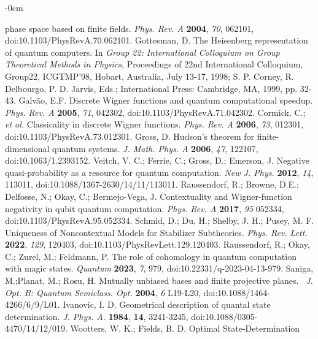 \documentclass[quantumrep,article,submit,pdftex,moreauthors]{Definitions/mdpi}
\begin{document}
\begin{adjustwidth}{-\extralength}{0cm}
\begin{thebibliography}{999}
phase space based on finite fields. \textit{Phys. Rev. A} \textbf{2004}, 
\textit{70}, 062101, doi:10.1103/PhysRevA.70.062101.
 Gottesman, D. The Heisenberg representation of quantum
computers. In \textit{Group 22: International Colloquium on Group
Theoretical Methods in Physics}, Proceedings of 22nd International
Colloquium, Group22, ICGTMP'98, Hobart, Australia, July 13-17, 1998; S. P.
Corney, R. Delbourgo, P. D. Jarvis, Eds.; International Press: Cambridge,
MA, 1999, pp. 32-43.
 Galv\~ao, E.F. Discrete Wigner functions and quantum
computational speedup. \textit{Phys. Rev. A} \textbf{2005}, \textit{71},
042302, doi:10.1103/PhysRevA.71.042302.
 Cormick, C.; \textit{et al.} Classicality in discrete
Wigner functions. \textit{Phys. Rev. A} \textbf{2006}, \textit{73}, 012301,
doi:10.1103/PhysRevA.73.012301.
 Gross, D. Hudson's theorem for
finite-dimensional quantum systems. \textit{J. Math. Phys. A} \textbf{2006}, 
\textit{47}, 122107, doi:10.1063/1.2393152.
 Veitch, V. C.; Ferrie, C.; Gross, D.; Emerson,
J. Negative quasi-probability as a resource for quantum computation. \textit{New
J. Phys.} \textbf{2012}, \textit{14}, 113011,
doi:10.1088/1367-2630/14/11/113011.
 Raussendorf, R.; Browne, D.E.; Delfosse, N.; Okay, C.;
Bermejo-Vega, J. Contextuality and Wigner-function negativity in qubit
quantum computation. \textit{Phys. Rev. A} \textbf{2017}, \textit{95}
052334, doi:10.1103/PhysRevA.95.052334.
 Schmid, D.; Du, H.; Shelby, J. H.; Pusey, M. F.
Uniqueness of Noncontextual Models for Stabilizer Subtheories. \textit{Phys.
Rev. Lett.} \textbf{2022}, \textit{129}, 120403,
doi:10.1103/PhysRevLett.129.120403.
 Raussendorf, R.; Okay, C.; Zurel, M.; Feldmann, P. The role
of cohomology in quantum computation with magic states. \textit{Quantum} 
\textbf{2023}, \textit{7}, 979, doi:10.22331/q-2023-04-13-979.
 Saniga, M.;Planat, M.; Rosu, H. Mutually unbiased bases
and finite projective planes. \textit{\ J. Opt. B: Quantum Semiclass. Opt.} 
\textbf{2004}, \textit{6} L19-L20, doi:10.1088/1464-4266/6/9/L01.
 Ivanovic, I. D. Geometrical description of quantal state
determination. \textit{J. Phys. A.} \textbf{1984}, \textbf{14}, 3241-3245,
doi:10.1088/0305-4470/14/12/019.
 Wootters, W. K.; Fields, B. D. Optimal State-Determination

\end{thebibliography}
\end{adjustwidth}
\end{document}
